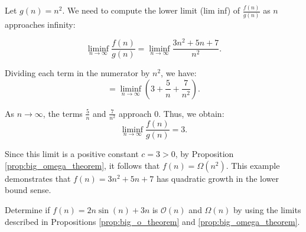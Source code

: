             \begin{solution}
            Let \( g(n) = n^2 \). We need to compute the lower limit (lim inf) of \( \frac{f(n)}{g(n)} \) as \( n \) approaches infinity:
            
            \[
            \liminf_{n \to \infty} \frac{f(n)}{g(n)} = \liminf_{n \to \infty} \frac{3n^2 + 5n + 7}{n^2}.
            \]
            
            Dividing each term in the numerator by \( n^2 \), we have:
            \[
            = \liminf_{n \to \infty} \left( 3 + \frac{5}{n} + \frac{7}{n^2} \right).
            \]
            
            As \( n \to \infty \), the terms \( \frac{5}{n} \) and \( \frac{7}{n^2} \) approach \( 0 \). Thus, we obtain:
            \[
            \liminf_{n \to \infty} \frac{f(n)}{g(n)} = 3.
            \]
            
            Since this limit is a positive constant \( c = 3 > 0 \), by Proposition \ref{prop:big_omega_theorem}, it follows that \( f(n) = \Omega(n^2) \). This example demonstrates that \( f(n) = 3n^2 + 5n + 7 \) has quadratic growth in the lower bound sense. \end{solution}

            \begin{example}
                Determine if \( f(n) = 2n \sin(n) + 3n \) is \( \mathcal{O}(n) \) and \( \Omega(n) \) by using the limits described in Propositions \ref{prop:big_o_theorem} and \ref{prop:big_omega_theorem}. \end{example}
                

